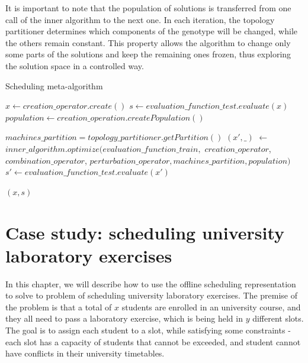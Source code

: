 It is important to note that the population of solutions is transferred from one call of the inner algorithm to the next one. In each iteration, the topology partitioner determines which components of the genotype will be changed, while the others remain constant. This property allows the algorithm  to change only some parts of the solutions and keep the remaining ones frozen, thus exploring the solution space in a controlled way.

\begin{algorithm}[!htbp]
    \caption{Scheduling meta-algorithm}
    \label{alg:sma}

    $x \gets creation\_operator.create()$\;
    $s \gets evaluation\_function\_test.evaluate(x)$\;
    $population \gets creation\_operation.createPopulation()$\;

     {

        $machines\_partition = topology\_partitioner.getPartition()$\;
        $(x', \_)$ $\gets$ $inner\_algorithm.optimize($$evaluation\_function\_train,$ \newline \hspace*{1em} $creation\_operator$, $combination\_operator$,  $perturbation\_operator,$\newline \hspace*{1em}$ machines\_partition, population)$\;
        $s' \gets evaluation\_function\_test.evaluate(x')$\;
    }

    \Return $(x, s)$\;
    \end{algorithm}

\section{Case study: scheduling university laboratory exercises}
\label{sec:case_study_lab}

In this chapter, we will describe how to use the offline scheduling representation to solve to problem of scheduling university laboratory exercises. The premise of the problem is that a total of $x$ students are enrolled in an university course, and they all need to pass a laboratory exercise, which is being held in $y$ different slots. The goal is to assign each student to a slot, while satisfying some constraints - each slot has a capacity of students that cannot be exceeded, and student cannot have conflicts in their university timetables.


